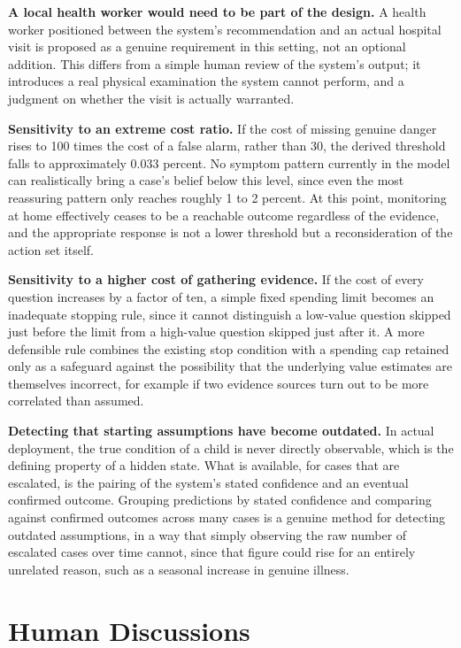\documentclass{article}
\begin{document}
\textbf{A local health worker would need to be part of the design.} A
health worker positioned between the system's recommendation and an
actual hospital visit is proposed as a genuine requirement in this
setting, not an optional addition. This differs from a simple human
review of the system's output; it introduces a real physical examination
the system cannot perform, and a judgment on whether the visit is
actually warranted.

\textbf{Sensitivity to an extreme cost ratio.} If the cost of missing
genuine danger rises to 100 times the cost of a false alarm, rather than
30, the derived threshold falls to approximately 0.033 percent. No
symptom pattern currently in the model can realistically bring a case's
belief below this level, since even the most reassuring pattern only
reaches roughly 1 to 2 percent. At this point, monitoring at home
effectively ceases to be a reachable outcome regardless of the evidence,
and the appropriate response is not a lower threshold but a
reconsideration of the action set itself.

\textbf{Sensitivity to a higher cost of gathering evidence.} If the cost
of every question increases by a factor of ten, a simple fixed spending
limit becomes an inadequate stopping rule, since it cannot distinguish a
low-value question skipped just before the limit from a high-value
question skipped just after it. A more defensible rule combines the
existing stop condition with a spending cap retained only as a safeguard
against the possibility that the underlying value estimates are
themselves incorrect, for example if two evidence sources turn out to be
more correlated than assumed.

\textbf{Detecting that starting assumptions have become outdated.} In
actual deployment, the true condition of a child is never directly
observable, which is the defining property of a hidden state. What is
available, for cases that are escalated, is the pairing of the system's
stated confidence and an eventual confirmed outcome. Grouping
predictions by stated confidence and comparing against confirmed
outcomes across many cases is a genuine method for detecting outdated
assumptions, in a way that simply observing the raw number of escalated
cases over time cannot, since that figure could rise for an entirely
unrelated reason, such as a seasonal increase in genuine illness.

\hypertarget{human-discussions}{%
\section{Human Discussions}\label{human-discussions}}
\end{document}
